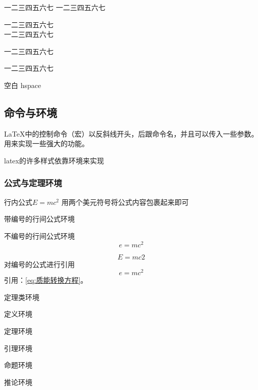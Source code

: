 \documentclass[../../main.tex]{subfiles}
\begin{document}
一二三四五六七
一二三四五六七

一二三四五六七\\
一二三四五六七

一二三四五六七\par
一二三四五六七

空白
hspace





\subsection{命令与环境}


LaTeX中的控制命令（宏）以反斜线开头，后跟命令名，并且可以传入一些参数。
用来实现一些强大的功能。



latex的许多样式依靠环境来实现


\subsubsection{公式与定理环境}

行内公式$E=mc^2$ 用两个美元符号将公式内容包裹起来即可


带编号的行间公式环境

不编号的行间公式环境
\[
e=mc^{2}
\]

\begin{equation}
E=mc2
\end{equation}
对编号的公式进行引用
\begin{equation}
  \label{eq:质能转换方程}
e=mc^{2}
\end{equation}
引用：\autoref{eq:质能转换方程}。





定理类环境

\begin{definition}
定义环境
\end{definition}

\begin{theorem}
定理环境
\end{theorem}


\begin{lemma}
引理环境
\end{lemma}


\begin{proposition}
命题环境
\end{proposition}



\begin{corollary}
推论环境
\end{corollary}
\end{document}
